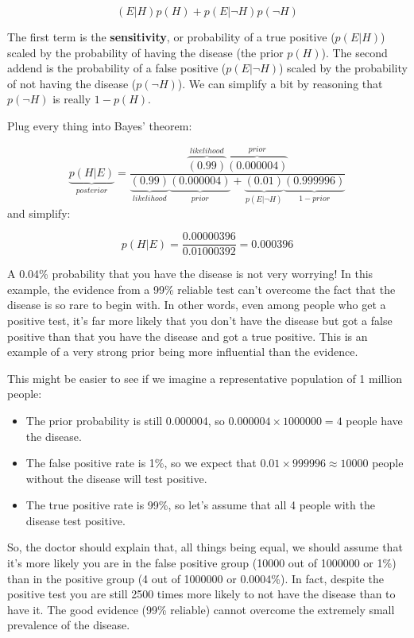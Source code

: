 \documentclass[
  13,
  letterpaper,
]{report}
\providecommand{\tightlist}{%
  \setlength{\itemsep}{0pt}\setlength{\parskip}{0pt}}
\begin{document}
\[\left(E|H\right)p\left(H\right)+p\left(E|\lnot H\right)p\left(\lnot H\right)\]

The first term is the \textbf{sensitivity}, or probability of a true
positive (\(p\left(E|H\right)\)) scaled by the probability of having the
disease (the prior \(p\left(H\right)\)). The second addend is the
probability of a false positive (\(p\left(E|\lnot H\right)\)) scaled by
the probability of not having the disease (\(p\left(\lnot H\right)\)).
We can simplify a bit by reasoning that \(p\left(\lnot H\right)\) is
really \(1-p\left(H\right)\).

Plug every thing into Bayes' theorem:

\[\underbrace{p\left(H|E\right)}_{posterior}=\frac{\overbrace{\left(0.99\right)}^{likelihood}\overbrace{\left(0.000004\right)}^{prior}}{\underbrace{\left(0.99\right)}_{likelihood}\underbrace{\left(0.000004\right)}_{prior}+\underbrace{\left(0.01\right)}_{p\left(E|\lnot H\right)}\underbrace{\left(0.999996\right)}_{1-prior}}\]
and simplify:

\[p\left(H|E\right)=\frac{0.00000396}{0.01000392}=0.000396\]

A 0.04\% probability that you have the disease is not very worrying! In
this example, the evidence from a 99\% reliable test can't overcome the
fact that the disease is so rare to begin with. In other words, even
among people who get a positive test, it's far more likely that you
don't have the disease but got a false positive than that you have the
disease and got a true positive. This is an example of a very strong
prior being more influential than the evidence.

This might be easier to see if we imagine a representative population of
1 million people:

\begin{itemize}
\tightlist
\item
  The prior probability is still 0.000004, so
  \(0.000004\times1000000=4\) people have the disease.
\item
  The false positive rate is 1\%, so we expect that
  \(0.01\times999996\approx10000\) people without the disease will test
  positive.
\item
  The true positive rate is 99\%, so let's assume that all 4 people with
  the disease test positive.
\end{itemize}

So, the doctor should explain that, all things being equal, we should
assume that it's more likely you are in the false positive group (10000
out of 1000000 or 1\%) than in the positive group (4 out of 1000000 or
0.0004\%). In fact, despite the positive test you are still 2500 times
more likely to not have the disease than to have it. The good evidence
(99\% reliable) cannot overcome the extremely small prevalence of the
disease.
\end{document}
